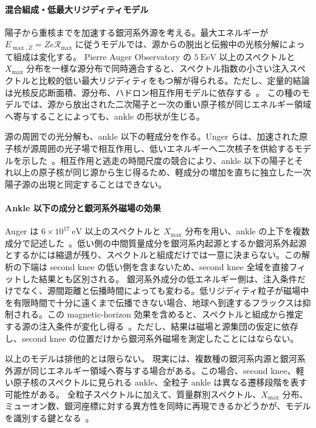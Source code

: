 \documentclass[book,paper=a4,fontsize=11pt]{jlreq}
\begin{document}
\paragraph{混合組成・低最大リジディティモデル}
陽子から重核までを加速する銀河系外源を考える。最大エネルギーが \(E_{\max,Z}=Ze\mathcal{R}_{\max}\) に従うモデルでは、源からの脱出と伝搬中の光核分解によって組成は変化する。
Pierre Auger Observatory の \(5\ \mathrm{EeV}\) 以上のスペクトルと \(X_{\max}\) 分布を一様な源分布で同時適合すると、スペクトル指数の小さい注入スペクトルと比較的低い最大リジディティをもつ解が得られる。ただし、定量的結論は光核反応断面積、源分布、ハドロン相互作用モデルに依存する~\cite{AugerCombinedFit2017}。
この種のモデルでは、源から放出された二次陽子と一次の重い原子核が同じエネルギー領域へ寄与することによっても、ankle の形状が生じる。

源の周囲での光分解も、ankle 以下の軽成分を作る。Unger らは、加速された原子核が源周囲の光子場で相互作用し、低いエネルギーへ二次核子を供給するモデルを示した~\cite{Unger2015SourceEnvironment}。相互作用と逃走の時間尺度の競合により、ankle 以下の陽子とそれ以上の原子核が同じ源から生じ得るため、軽成分の増加を直ちに独立した一次陽子源の出現と同定することはできない。

\paragraph{Ankle 以下の成分と銀河系外磁場の効果}
Auger は \(6\times10^{17}\ \mathrm{eV}\) 以上のスペクトルと \(X_{\max}\) 分布を用い、ankle の上下を複数成分で記述した~\cite{Auger2023AcrossAnkle}。低い側の中間質量成分を銀河系内起源とするか銀河系外起源とするかには縮退が残り、スペクトルと組成だけでは一意に決まらない。この解析の下端は second knee の低い側を含まないため、second knee 全域を直接フィットした結果とも区別される。
銀河系外成分の低エネルギー側は、注入条件だけでなく、源間距離と伝播時間によっても変わる。低リジディティ粒子が磁場中を有限時間で十分に遠くまで伝播できない場合、地球へ到達するフラックスは抑制される。この magnetic-horizon 効果を含めると、スペクトルと組成から推定する源の注入条件が変化し得る~\cite{Auger2024MagneticHorizon}。ただし、結果は磁場と源集団の仮定に依存し、second knee の位置だけから銀河系外磁場を測定したことにはならない。

以上のモデルは排他的とは限らない。
現実には、複数種の銀河系内源と銀河系外源が同じエネルギー領域へ寄与する場合がある。この場合、second knee、軽い原子核のスペクトルに見られる ankle、全粒子 ankle は異なる遷移段階を表す可能性がある。
全粒子スペクトルに加えて、質量群別スペクトル、\(X_{\max}\) 分布、ミューオン数、銀河座標に対する異方性を同時に再現できるかどうかが、モデルを識別する鍵となる~\cite{PDGCosmicRays,Cristofari2023}。
\end{document}
